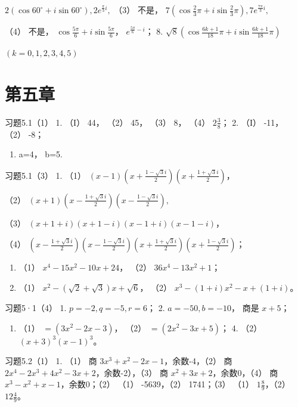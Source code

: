 \(2(\cos 60^{\circ} + i\sin 60^{\circ}), 2e^{\frac{\pi}{3}i},\) （3）
不是，
\(7\left(\cos \frac{2}{3}\pi + i\sin \frac{2}{3}\pi\right), 7e^{\frac{7\pi}{3}i},\)

（4） 不是， \(\cos \frac{5\pi}{6} + i \sin \frac{5\pi}{6}\)，
\(e^{\frac{5\pi}{6} - i}\)； 8.
\(\sqrt{8} \left( \cos \frac{6k + 1}{18} \pi + i \sin \frac{6k + 1}{18} \pi \right)\)

\((k = 0,1,2,3,4,5)\)

\section{第五章}

习题5.1（1） 1. （I） 44， （2） 45， （3） 8， （4） \(2\frac{3}{8}\)；
2. （I） -11， （2） -8；

\begin{enumerate}[start=3]
\item
  a=4， b=5.
\end{enumerate}

习题5.1（3） 1. （1）
\((x - 1)\left(x + \frac{1 - \sqrt{3}i}{2}\right)\left(x + \frac{1 + \sqrt{3}i}{2}\right)\)，

（2）
\((x + 1)\left(x - \frac{1 + \sqrt{3}i}{2}\right)\left(x - \frac{1 - \sqrt{3}i}{2}\right),\)

（3） \((x + 1 + i)(x + 1 - i)(x - 1 + i)(x - 1 - i)\)，

（4）
\(\left(x - \frac{1 + \sqrt{3}i}{2}\right)\left(x - \frac{1 - \sqrt{3}i}{2}\right)\left(x + \frac{1 + \sqrt{3}i}{2}\right)\left(x + \frac{1 - \sqrt{3}i}{2}\right)\)；

\begin{enumerate}[start=2]
\item
  （1） \(x^{4} - 15x^{2} - 10x + 24\)， （2）
  \(36x^{4} - 13x^{2} + 1\)；
\item
  （1） \(x^{2} - (\sqrt{2} + \sqrt{3})x + \sqrt{6}\)， （2）
  \(x^{3} - (1 + i)x^{2} - x + (1 + i)\)。
\end{enumerate}

习题5·1（4） 1. \(p = -2, q = -5, r = 6\)； 2. \(a = -50, b = -10\)，
商是 \(x + 5\)；

\begin{enumerate}[start=3]
\item
  （1） \(= (3x^{2} - 2x - 3)\)， （2） \(= (2x^{2} - 3x + 5)\)； 4.
  （2） \((x + 3)^{3}(x - 1)^{3}\)。
\end{enumerate}

习题5.2（1） 1. （1） 商 \(3x^{3} + x^{2} - 2x - 1\)，余数-4，（2） 商
\(2x^{4} - 2x^{3} + 4x^{2} - 3x + 2\)，余数-2），（3） 商
\(x^{2} + 3x + 2\)，余数0，（4） 商
\(x^{3} - x^{2} + x - 1\)，余数0；（2） （1） -5639，（2） 1741；（3）
（1） \(1\frac{8}{9}\)，（2） \(12\frac{4}{9}\)。

